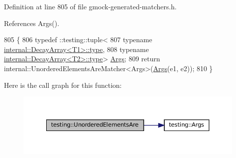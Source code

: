 Definition at line 805 of file gmock-\/generated-\/matchers.\+h.



References Args().


\begin{DoxyCode}
805                                                  \{
806   typedef ::testing::tuple<
807       \textcolor{keyword}{typename} \hyperlink{namespacegenerate__debs_a50bc9a7ecac9584553e089a448bcde58}{internal::DecayArray<T1>::type},
808       \textcolor{keyword}{typename} \hyperlink{namespacegenerate__debs_a50bc9a7ecac9584553e089a448bcde58}{internal::DecayArray<T2>::type}> 
      \hyperlink{namespacetesting_a09ac462e8d6ed468cbfaa9c767aee0aa}{Args};
809   \textcolor{keywordflow}{return} internal::UnorderedElementsAreMatcher<Args>(\hyperlink{namespacetesting_a09ac462e8d6ed468cbfaa9c767aee0aa}{Args}(e1, e2));
810 \}
\end{DoxyCode}
Here is the call graph for this function\+:
\nopagebreak
\begin{figure}[H]
\begin{center}
\leavevmode
\includegraphics[width=350pt]{namespacetesting_aedcecfa2107e03f5e2837f7124f73a87_cgraph}
\end{center}
\end{figure}
\mbox{\label{namespacetesting_aec0f9ede2dc05de791c61eae0504a757}} 
